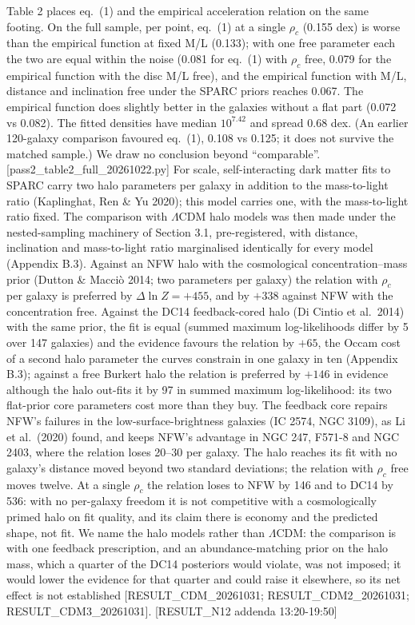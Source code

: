 \documentclass[
  10pt,
]{article}
\begin{document}
Table 2 places eq.~(1) and the empirical acceleration relation on the
same footing. On the full sample, per point, eq.~(1) at a single $\rho_c$ (0.155 dex) is worse than the empirical function at fixed M/L (0.133); with one free parameter each the two are equal within the noise (0.081 for eq.~(1) with $\rho_c$ free, 0.079 for the empirical function with the disc M/L free), and the empirical function with M/L, distance and inclination free under the SPARC priors reaches 0.067. The empirical function does slightly better in the galaxies without a flat part (0.072 vs 0.082). The fitted densities have median $10^{7.42}$ and spread 0.68 dex. (An earlier 120-galaxy comparison favoured eq.~(1), 0.108 vs 0.125; it does not survive the matched sample.) We draw no conclusion beyond ``comparable''. {[}pass2\_table2\_full\_20261022.py{]} For scale, self-interacting dark matter fits to SPARC carry two halo parameters per galaxy in addition to the mass-to-light ratio (Kaplinghat, Ren \& Yu 2020); this model carries one, with the mass-to-light ratio fixed. The comparison with $\Lambda$CDM halo models was then made under the nested-sampling machinery of Section 3.1, pre-registered, with distance, inclination and mass-to-light ratio marginalised identically for every model (Appendix B.3). Against an NFW halo with the cosmological concentration--mass prior (Dutton \& Macci\`o 2014; two parameters per galaxy) the relation with $\rho_c$ per galaxy is preferred by $\Delta\ln Z=+455$, and by $+338$ against NFW with the concentration free. Against the DC14 feedback-cored halo (Di Cintio et al.~2014) with the same prior, the fit is equal (summed maximum log-likelihoods differ by 5 over 147 galaxies) and the evidence favours the relation by $+65$, the Occam cost of a second halo parameter the curves constrain in one galaxy in ten (Appendix B.3); against a free Burkert halo the relation is preferred by $+146$ in evidence although the halo out-fits it by 97 in summed maximum log-likelihood: its two flat-prior core parameters cost more than they buy. The feedback core repairs NFW's failures in the low-surface-brightness galaxies (IC 2574, NGC 3109), as Li et al.~(2020) found, and keeps NFW's advantage in NGC 247, F571-8 and NGC 2403, where the relation loses 20--30 per galaxy. The halo reaches its fit with no galaxy's distance moved beyond two standard deviations; the relation with $\rho_c$ free moves twelve. At a single $\rho_c$ the relation loses to NFW by 146 and to DC14 by 536: with no per-galaxy freedom it is not competitive with a cosmologically primed halo on fit quality, and its claim there is economy and the predicted shape, not fit. We name the halo models rather than $\Lambda$CDM: the comparison is with one feedback prescription, and an abundance-matching prior on the halo mass, which a quarter of the DC14 posteriors would violate, was not imposed; it would lower the evidence for that quarter and could raise it elsewhere, so its net effect is not established {[}RESULT\_CDM\_20261031; RESULT\_CDM2\_20261031; RESULT\_CDM3\_20261031{]}. {[}RESULT\_N12 addenda
13:20-19:50{]}
\end{document}
